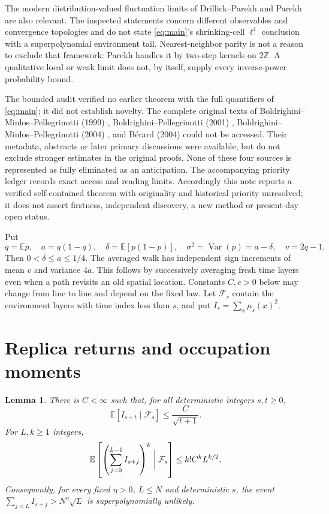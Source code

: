 \documentclass[11pt]{article}
\newtheorem{lemma}[theorem]{Lemma}
\newcommand{\EE}{\mathbb E}
\newcommand{\ZZ}{\mathbb Z}
\newcommand{\cF}{\mathcal F}
\DeclareMathOperator{\Var}{Var}
\begin{document}
The modern distribution-valued fluctuation limits of
Drillick--Parekh \cite{DP} and Parekh \cite{Parekh} are also relevant.
The inspected statements concern different observables and convergence
topologies and do not state \eqref{eq:main}'s shrinking-cell
$\ell^1$ conclusion with a superpolynomial environment tail.
Nearest-neighbor parity is not a reason to exclude that framework:
Parekh \cite[Section~6.1, Remark~6.2]{Parekh} handles it by two-step
kernels on $2\ZZ$. A qualitative local or weak limit does not, by
itself, supply every inverse-power probability bound.

The bounded audit verified no earlier theorem with the full
quantifiers of \eqref{eq:main}; it did not establish novelty.
The complete original texts of Boldrighini--Minlos--Pellegrinotti
(1999) \cite{BMP1999}, Boldrighini--Pellegrinotti
(2001) \cite{BP2001}, Boldrighini--Minlos--Pellegrinotti
(2004) \cite{BMP2004}, and B\'erard (2004) \cite{Berard} could not be
accessed. Their metadata, abstracts or later primary discussions were
available, but do not exclude stronger estimates in the original
proofs. None of these four sources is represented as fully eliminated
as an anticipation. The accompanying priority ledger records exact
access and reading limits. Accordingly this note reports a verified
self-contained theorem with originality and historical priority
unresolved; it does not assert firstness, independent discovery,
a new method or present-day open status.

Put
\begin{equation}\label{eq:params}
 q=\EE p,\quad a=q(1-q),\quad
 \delta=\EE[p(1-p)],\quad \sigma^2=\Var(p)=a-\delta,\quad v=2q-1.
\end{equation}
Then $0<\delta\leq a\leq1/4$. The averaged walk has independent
sign increments of mean $v$ and variance $4a$. This follows by
successively averaging fresh time layers even when a path revisits
an old spatial location. Constants $C,c>0$ below may change from
line to line and depend on the fixed law. Let $\cF_s$ contain the
environment layers with time index less than $s$, and put
$I_s=\sum_x\mu_s(x)^2$.

\section{Replica returns and occupation moments}

\begin{lemma}\label{lem:overlap}
There is $C<\infty$ such that, for all deterministic integers $s,t\geq0$,
\begin{equation}\label{eq:condoverlap}
       \EE[I_{s+t}\mid\cF_s]\leq \frac{C}{\sqrt{t+1}}.
\end{equation}
For $L,k\geq1$ integers,
\begin{equation}\label{eq:moments}
 \EE\left[\left(\sum_{j=0}^{L-1}I_{s+j}\right)^k
                    \biggm|\cF_s\right]\leq k!C^kL^{k/2}.
\end{equation}
Consequently, for every fixed $\eta>0$, $L\leq N$ and deterministic
$s$, the event
$\sum_{j<L}I_{s+j}>N^\eta\sqrt L$ is superpolynomially unlikely.
\end{lemma}
\end{document}
